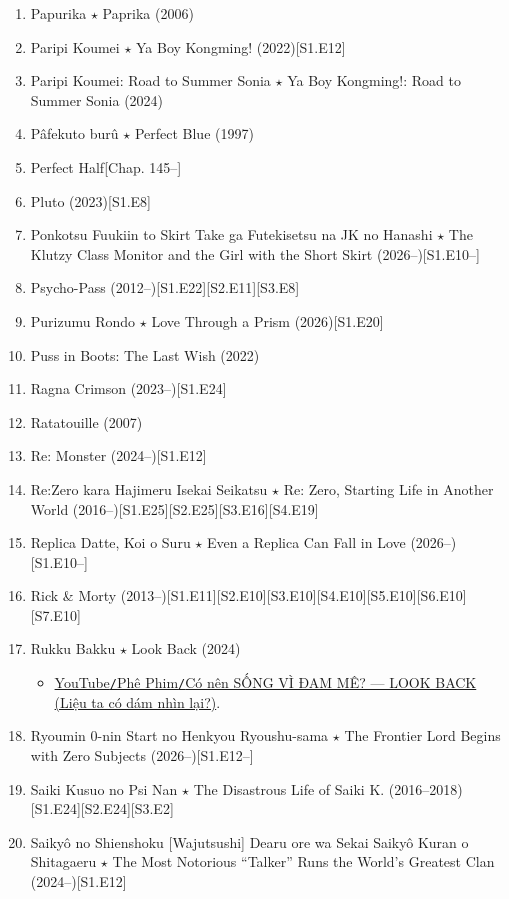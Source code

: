 \documentclass{article}
\begin{document}
\begin{enumerate}
    \item {\sc Papurika $\star$ Paprika} (2006)
    \item {\sc Paripi Koumei $\star$ Ya Boy Kongming!} (2022)\hfill[S1.E12]
    \item {\sc Paripi Koumei: Road to Summer Sonia $\star$ Ya Boy Kongming!: Road to Summer Sonia} (2024)
    \item {\sc Pâfekuto burû $\star$ Perfect Blue} (1997)
    \item Perfect Half\hfill[Chap. 145--]
    \item {\sc Pluto} (2023)\hfill[S1.E8]
    \item Ponkotsu Fuukiin to Skirt Take ga Futekisetsu na JK no Hanashi $\star$ The Klutzy Class Monitor and the Girl with the Short Skirt (2026--)\hfill[S1.E10--]
    \item {\sc Psycho-Pass} (2012--)\hfill[S1.E22][S2.E11][S3.E8]
    \item {\sc Purizumu Rondo $\star$ Love Through a Prism} (2026)\hfill[S1.E20]
    \item {\sc Puss in Boots: The Last Wish} (2022)
    \item {\sc Ragna Crimson} (2023--)\hfill[S1.E24]
    \item {\sc Ratatouille} (2007)
    \item {\sc Re: Monster} (2024--)\hfill[S1.E12]
    \item {\sc Re:Zero kara Hajimeru Isekai Seikatsu $\star$ Re: Zero, Starting Life in Another World} (2016--)\hfill[S1.E25][S2.E25][S3.E16][S4.E19]
    \item Replica Datte, Koi o Suru $\star$ Even a Replica Can Fall in Love (2026--)\hfill[S1.E10--]
    \item Rick \& Morty (2013--)\hfill[S1.E11][S2.E10][S3.E10][S4.E10][S5.E10][S6.E10][S7.E10]
    \item {\sc Rukku Bakku $\star$ Look Back} (2024)
    \begin{itemize}
    	\item \href{https://www.youtube.com/watch?v=dw_N-6apa_w}{YouTube{\tt/}Phê Phim{\tt/}Có nên SỐNG VÌ ĐAM MÊ? — LOOK BACK (Liệu ta có dám nhìn lại?)}.
    \end{itemize}
    \item Ryoumin 0-nin Start no Henkyou Ryoushu-sama $\star$ The Frontier Lord Begins with Zero Subjects (2026--)\hfill[S1.E12--]
    \item {\sc Saiki Kusuo no Psi Nan $\star$ The Disastrous Life of Saiki K.} (2016--2018)\hfill[S1.E24][S2.E24][S3.E2]
    \item {\sc Saikyô no Shienshoku [Wajutsushi] Dearu ore wa Sekai Saikyô Kuran o Shitagaeru $\star$ The Most Notorious ``Talker'' Runs the World's Greatest Clan} (2024--)\hfill[S1.E12]

\end{enumerate}
\end{document}

